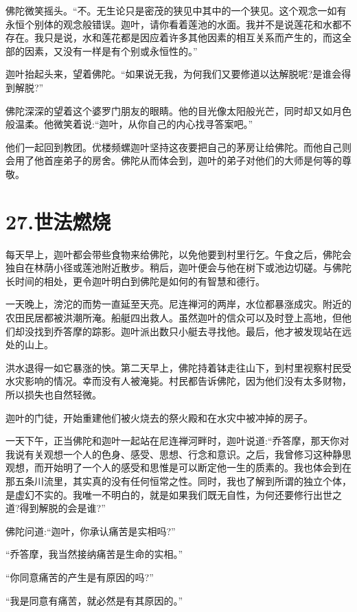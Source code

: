 \documentclass[12pt,twoside,openany]{book}
\begin{document}
佛陀微笑摇头。“不。无生论只是密茂的狭见中其中的一个狭见。这个观念一如有永恒个别体的观念般错误。迦叶，请你看着莲池的水面。我并不是说莲花和水都不存在。我只是说，水和莲花都是因应着许多其他因素的相互关系而产生的，而这全部的因素，又没有一样是有个别或永恒性的。”

迦叶抬起头来，望着佛陀。“如果说无我，为何我们又要修道以达解脱呢?是谁会得到解脱?”

佛陀深深的望着这个婆罗门朋友的眼睛。他的目光像太阳般光芒，同时却又如月色般温柔。他微笑着说:“迦叶，从你自己的内心找寻答案吧。”

他们一起回到教团。优楼频螺迦叶坚持这夜要把自己的茅房让给佛陀。而他自己则会用了他首座弟子的房舍。佛陀从而体会到，迦叶的弟子对他们的大师是何等的尊敬。


\chapter{27.世法燃烧}\label{ch27}

每天早上，迦叶都会带些食物来给佛陀，以免他要到村里行乞。午食之后，佛陀会独自在林荫小径或莲池附近散步。稍后，迦叶便会与他在树下或池边切磋。与佛陀长时间的相处，更令迦叶明白到佛陀是如何的有智慧和德行。

一天晚上，滂沱的而势一直延至天亮。尼连禅河的两岸，水位都暴涨成灾。附近的农田民居都被洪潮所淹。船艇四出救人。虽然迦叶的信众可以及时登上高地，但他们却没找到乔答摩的踪影。迦叶派出数只小艇去寻找他。最后，他才被发现站在远处的山上。

洪水退得一如它暴涨的怏。第二天早上，佛陀持着钵走往山下，到村里视察村民受水灾影响的情况。幸而没有人被淹毙。村民都告诉佛陀，因为他们没有太多财物，所以损失也自然轻微。

迦叶的门徒，开始重建他们被火烧去的祭火殿和在水灾中被冲掉的房子。

一天下午，正当佛陀和迦叶一起站在尼连禅河畔时，迦叶说道:“乔答摩，那天你对我说有关观想一个人的色身、感受、思想、行念和意识。之后，我曾修习这种静思观想，而开始明了一个人的感受和思惟是可以断定他一生的质素的。我也体会到在那五条川流里，其实真的没有任何恒常之性。同时，我也了解到所谓的独立个体，是虚幻不实的。我唯一不明白的，就是如果我们既无自性，为何还要修行出世之道?得到解脱的会是谁?”

佛陀问道:“迦叶，你承认痛苦是实相吗?”

“乔答摩，我当然接纳痛苦是生命的实相。”

“你同意痛苦的产生是有原因的吗?”

“我是同意有痛苦，就必然是有其原因的。”
\end{document}
